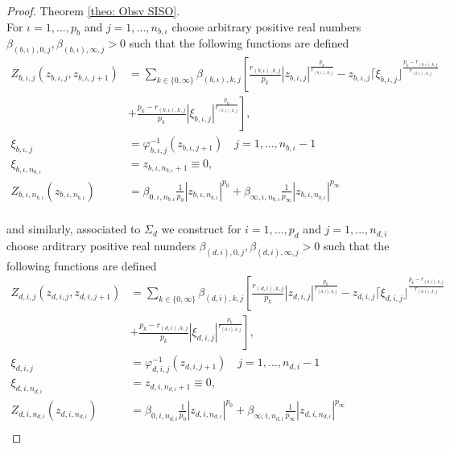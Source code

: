 \documentclass[11pt,letterpaper,twoside,openright]{report}
\begin{document}
\begin{proof}{Theorem \ref{theo: Obsv SISO}. \\}
	For $\iota=1,...,p_b$ and $j=1,...,n_{b,\iota}$ choose arbitrary positive real numbers $\beta_{(b,\iota),0,j},\beta_{(b,\iota),\infty,j} > 0$ such that the following functions are defined
	\begin{equation}
		\begin{split}\label{ecu: CH4 Zb}
			Z_{b,\iota,j}(z_{b,\iota,j},z_{b,\iota,j+1}) &= \displaystyle\sum_{k\in \{0,\infty\}}^{}  \beta_{(b,\iota),k,j} \left[ \frac{r_{(b,\iota),k,j}}{p_k}|z_{b,\iota,j}|^{\frac{p_k}{r_{(b,\iota),k,j}}} - z_{b,\iota,j} \lceil \xi_{b,\iota,j} \rfloor^{\frac{p_k-r_{(b,\iota),k,j}}{r_{(b,\iota),k,j}}} \right.\\
			&\left. +\frac{p_k-r_{(b,\iota),k,j}}{p_k}|\xi_{b,\iota,j}|^{\frac{p_k}{r_{(b,\iota),k,j}}}   \right],\\
			\xi_{b,\iota,j} &= \varphi_{b,\iota,j}^{-1}(z_{b,\iota,j+1}) \quad j=1,...,n_{b,\iota}-1 \\
			\xi_{b,\iota,n_{b,\iota}} &= z_{b,\iota,n_{b,\iota}+1} \equiv 0,\\
			Z_{b,\iota,n_{b,\iota}}(z_{b,\iota,n_{b,\iota}}) &= \beta_{0,\iota,n_{b,\iota}} \frac{1}{p_0}|z_{b,\iota,n_{b,\iota}}|^{p_0} + \beta_{\infty,\iota,n_{b,\iota}} \frac{1}{p_\infty}|z_{b,\iota,n_{b,\iota}}|^{p_\infty}  \\
		\end{split}
	\end{equation}

	and similarly, associated to $\Sigma_d$ we construct for $i=1,...,p_d$ and $j=1,...,n_{d,i}$ choose arditrary positive real numders $\beta_{(d,i),0,j},\beta_{(d,i),\infty,j} > 0$ such that the following functions are defined
	\begin{equation}
		\begin{split}\label{ecu: CH4 Zd}
		Z_{d,i,j}(z_{d,i,j},z_{d,i,j+1}) &= \displaystyle\sum_{k\in \{0,\infty\}}^{}  \beta_{(d,i),k,j} \left[ \frac{r_{(d,i),k,j}}{p_k}|z_{d,i,j}|^{\frac{p_k}{r_{(d,i),k,j}}} - z_{d,i,j} \lceil \xi_{d,i,j} \rfloor^{\frac{p_k-r_{(d,i),k,j}}{r_{(d,i),k,j}}} \right.\\
		&\left. +\frac{p_k-r_{(d,i),k,j}}{p_k}|\xi_{d,i,j}|^{\frac{p_k}{r_{(d,i),k,j}}}   \right],\\
		\xi_{d,i,j} &= \varphi_{d,i,j}^{-1}(z_{d,i,j+1}) \quad j=1,...,n_{d,i}-1 \\
		\xi_{d,i,n_{d,i}} &= z_{d,i,n_{d,i}+1} \equiv 0,\\
		Z_{d,i,n_{d,i}}(z_{d,i,n_{d,i}}) &= \beta_{0,i,n_{d,i}} \frac{1}{p_0}|z_{d,i,n_{d,i}}|^{p_0} + \beta_{\infty,i,n_{d,i}} \frac{1}{p_\infty}|z_{d,i,n_{d,i}}|^{p_\infty}  \\
	\end{split}
\end{equation}
	

\end{proof}
\end{document}
